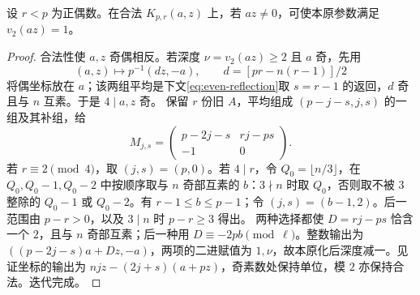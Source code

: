 \begin{lemma}\label{lem:binary-depth}
设 $r<p$ 为正偶数。在合法 $K_{p,r}(a,z)$ 上，若 $az\ne0$，可使本原参数满足 $v_2(az)=1$。
\end{lemma}
\begin{proof}
合法性使 $a,z$ 奇偶相反。若深度 $\nu=v_2(az)\ge2$ 且 $a$ 奇，先用
\[
(a,z)\mapsto p^{-1}(dz,-a),\qquad d=[pr-n(r-1)]/2
\]
将偶坐标放在 $a$；该两组平均是下文\eqref{eq:even-reflection}取 $s=r-1$ 的返回，$d$ 奇且与 $n$ 互素。于是 $4\mid a,z$ 奇。
保留 $r$ 份旧 $A$，平均组成 $(p-j-s,j,s)$ 的一组及其补组，给
\[
M_{j,s}=\begin{pmatrix}p-2j-s&rj-ps\\-1&0\end{pmatrix}.
\]
若 $r\equiv2\pmod4$，取 $(j,s)=(p,0)$。若 $4\mid r$，令 $Q_0=\lfloor n/3\rfloor$，在 $Q_0,Q_0-1,Q_0-2$ 中按顺序取与 $n$ 奇部互素的 $b$：$3\nmid n$ 时取 $Q_0$，否则取不被 $3$ 整除的 $Q_0-1$ 或 $Q_0-2$。有 $r-1\le b\le p-1$；令 $(j,s)=(b-1,2)$。后一范围由 $p-r>0$，以及 $3\mid n$ 时 $p-r\ge3$ 得出。
两种选择都使 $D=rj-ps$ 恰含一个 $2$，且与 $n$ 奇部互素；后一种用 $D\equiv-2pb\pmod\ell$。整数输出为 $((p-2j-s)a+Dz,-a)$，两项的二进赋值为 $1,\nu$，故本原化后深度减一。见证坐标的输出为 $njz-(2j+s)(a+pz)$，奇素数处保持单位，模 $2$ 亦保持合法。迭代完成。
\end{proof}


